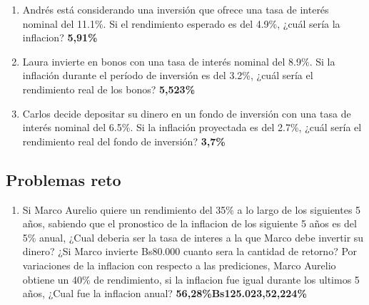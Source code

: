 \begin{enumerate}
    \textbf{3,016\%}
    \item Andrés está considerando una inversión que ofrece una tasa de interés nominal del 11.1\%. Si el rendimiento esperado es del 4.9\%, ¿cuál sería la inflacion?
    \textbf{5,91\%}
    \item Laura invierte en bonos con una tasa de interés nominal del 8.9\%. Si la inflación durante el período de inversión es del 3.2\%, ¿cuál sería el rendimiento real de los bonos?
    \textbf{5,523\%}
    \item Carlos decide depositar su dinero en un fondo de inversión con una tasa de interés nominal del 6.5\%. Si la inflación proyectada es del 2.7\%, ¿cuál sería el rendimiento real del fondo de inversión?
    \textbf{3,7\%}
\end{enumerate}
\subsection*{Problemas reto}
\begin{enumerate}
    \item Si Marco Aurelio quiere un rendimiento del 35\% a lo largo de los siguientes 5 años, sabiendo que el pronostico de la inflacion 
    de los siguiente 5 años es del 5\% anual, ¿Cual deberia ser la tasa de interes a la que Marco debe invertir su dinero? ¿Si Marco invierte 
    Bs80.000 cuanto sera la cantidad de retorno? Por variaciones de la inflacion con respecto a las prediciones, Marco Aurelio obtiene un 40\% de rendimiento, 
    si la inflacion fue igual durante los ultimos 5 años, ¿Cual fue la inflacion anual?
    \textbf{56,28\%}\textbf{Bs125.023,5}\textbf{2,224\%}
\end{enumerate}